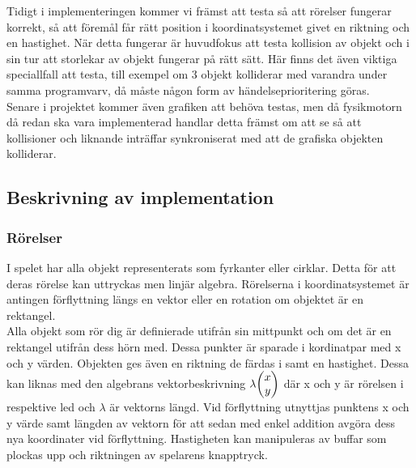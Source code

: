 \documentclass[12pt,a4paper]{article}
\newcounter{subsubsubsection}[subsubsection]
\begin{document}
Tidigt i implementeringen kommer vi främst att testa så att rörelser fungerar korrekt, så att föremål får rätt position i koordinatsystemet givet en riktning och en hastighet. När detta fungerar är huvudfokus att testa kollision av objekt och i sin tur att storlekar av objekt fungerar på rätt sätt. Här finns det även viktiga speciallfall att testa, till exempel om 3 objekt kolliderar med varandra under samma programvarv, då måste någon form av händelseprioritering göras. \\

Senare i projektet kommer även grafiken att behöva testas, men då fysikmotorn då redan ska vara implementerad handlar detta främst om att se så att kollisioner och liknande inträffar synkroniserat med att de grafiska objekten kolliderar. \\

\subsection{Beskrivning av implementation}


\subsubsection{Rörelser}
I spelet har alla objekt representerats som fyrkanter eller cirklar. Detta för att deras rörelse kan uttryckas men linjär algebra. Rörelserna i koordinatsystemet är antingen förflyttning längs en vektor eller en rotation om objektet är en rektangel. \\

Alla objekt som rör dig är definierade utifrån sin mittpunkt och om det är en rektangel utifrån dess hörn med. Dessa punkter är sparade i kordinatpar med x och y värden. Objekten ges även en riktning de färdas i samt en hastighet. Dessa kan liknas med den algebrans vektorbeskrivning
\begin{math}
$$\lambda$$
	\begin{pmatrix}
		x \\
		y
	\end{pmatrix}
\end{math}
där x och y är rörelsen i respektive led och $\lambda$ är vektorns längd. Vid förflyttning utnyttjas punktens x och y värde samt längden av vektorn för att sedan med enkel addition avgöra dess nya koordinater vid förflyttning. Hastigheten kan manipuleras av buffar som plockas upp och riktningen av spelarens knapptryck. \\
\end{document}
